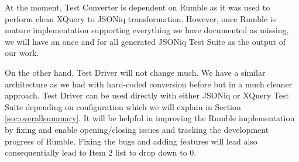 

At the moment, Test Converter is dependent on Rumble as it was used to perform clean XQuery to JSONiq transformation. However, once Rumble is mature implementation supporting everything we have documented as missing, we will have an once and for all generated JSONiq Test Suite as the output of our work. 

On the other hand, Test Driver will not change much. We have a similar architecture as we had with hard-coded conversion before but in a much cleaner approach. Test Driver can be used directly with either JSONiq or XQuery Test Suite depending on configuration which we will explain in Section \ref{sec:overallsummary}. It will be helpful in  improving the Rumble implementation by fixing and enable opening/closing issues and tracking the development progress of Rumble. Fixing the bugs and adding features will lead also consequentially lead to Item 2 list to drop down to 0. 
